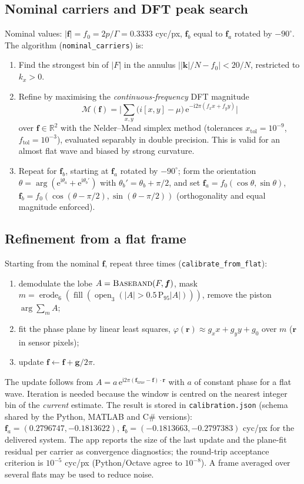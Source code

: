 \documentclass[11pt,a4paper]{article}
\theoremstyle{definition}
\newcommand{\vr}{\bm{r}}
\newcommand{\vk}{\bm{k}}
\newcommand{\vf}{\bm{f}}
\newcommand{\ii}{\mathrm{i}}
\newcommand{\ee}{\mathrm{e}}
\newcommand{\code}[1]{\texttt{\small #1}}
\begin{document}
\subsection{Nominal carriers and DFT peak search}
Nominal values: $|\vf|=f_0=2p/\Gamma=0.3333$ cyc/px, $\vf_b$ equal to $\vf_a$ rotated by $-90^\circ$. The algorithm (\code{nominal\_carriers}) is:
\begin{enumerate}
\item Find the strongest bin of $|F|$ in the annulus $\big||\vk|/N-f_0\big|<20/N$, restricted to $k_x>0$.
\item Refine by maximising the \emph{continuous-frequency} DFT magnitude
\begin{equation}
\mathcal M(\vf)=\Big|\sum_{x,y}\big(i[x,y]-\mu\big)\,\ee^{-\ii2\pi(f_xx+f_yy)}\Big|
\end{equation}
over $\vf\in\mathbb R^2$ with the Nelder--Mead simplex method (tolerances $x_{\mathrm{tol}}=10^{-9}$, $f_{\mathrm{tol}}=10^{-3}$), evaluated separably in double precision. This is valid for an almost flat wave and biased by strong curvature.
\item Repeat for $\vf_b$, starting at $\vf_a$ rotated by $-90^\circ$; form the orientation $\theta=\arg(\ee^{\ii\theta_a}+\ee^{\ii\theta_b'})$ with $\theta_b'=\theta_b+\pi/2$, and set
$\vf_a=f_0(\cos\theta,\sin\theta)$, $\vf_b=f_0(\cos(\theta-\pi/2),\sin(\theta-\pi/2))$ (orthogonality and equal magnitude enforced).
\end{enumerate}

\subsection{Refinement from a flat frame}
Starting from the nominal $\vf$, repeat three times (\code{calibrate\_from\_flat}):
\begin{enumerate}
\item demodulate the lobe $A=\textsc{Baseband}(F,\vf)$, mask $m=\operatorname{erode}_6(\operatorname{fill}(\operatorname{open}_3(|A|>0.5\,\mathrm P_{95}|A|)))$, remove the piston $\arg\sum_m A$;
\item fit the phase plane by linear least squares, $\varphi(\vr)\approx g_xx+g_yy+g_0$ over $m$ ($\vr$ in sensor pixels);
\item update $\vf\leftarrow\vf+\bm g/2\pi$.
\end{enumerate}
The update follows from $A=a\,\ee^{\ii2\pi(\vf_{\mathrm{true}}-\vf)\cdot\vr}$ with $a$ of constant phase for a flat wave. Iteration is needed because the window is centred on the nearest integer bin of the \emph{current} estimate. The result is stored in \code{calibration.json} (schema shared by the
Python, MATLAB and C\# versions): $\vf_a=(0.2796747,-0.1813622)$, $\vf_b=(-0.1813663,-0.2797383)$ cyc/px for the delivered system. The app reports the size of the last update and the plane-fit residual per carrier as convergence diagnostics; the round-trip acceptance criterion is $10^{-5}$ cyc/px
(Python/Octave agree to $10^{-8}$). A frame averaged over several flats may be used to reduce noise.
\end{document}
